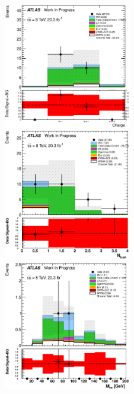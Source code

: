 \begin{figure}[ht!]
\centering
\includegraphics[width=0.495\textwidth]{figures/appendix_signal_selection/Nov24Update_FakeSys_KFacSys_LinearY_Rebin/output/jobs/MxM/DataFull_Rates_May13_FakeRatesExactly2Loose_MuonMxMBJetGt0_ElBJetGt0SubtractPC_MxM/PreselectionNov23_15_0SFOS_physics/weight_all/eps/TotalCharge_histratio.eps}
\includegraphics[width=0.495\textwidth]{figures/appendix_signal_selection/Nov24Update_FakeSys_KFacSys_LinearY_Rebin/output/jobs/MxM/DataFull_Rates_May13_FakeRatesExactly2Loose_MuonMxMBJetGt0_ElBJetGt0SubtractPC_MxM/PreselectionNov23_15_0SFOS_ChargeAbs1_physics/weight_all/eps/NBTaggedJets_histratio.eps}
\includegraphics[width=0.495\textwidth]{figures/appendix_signal_selection/Nov24Update_FakeSys_KFacSys_LinearY_Rebin/output/jobs/MxM/DataFull_Rates_May13_FakeRatesExactly2Loose_MuonMxMBJetGt0_ElBJetGt0SubtractPC_MxM/PreselectionNov23_15_0SFOS_ChargeAbs1_BVeto85_SFMllGt20_physics/weight_all/eps/InvariantMassElEl_histratio.eps}

\end{figure}
